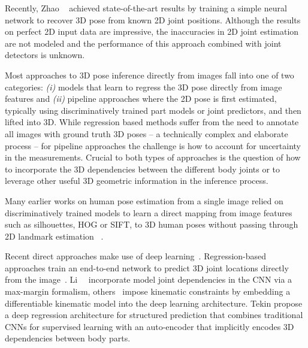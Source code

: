 \documentclass[10pt,twocolumn,letterpaper]{article}
\begin{document}
Recently, Zhao \etal~\cite{zhao2016simple} achieved state-of-the-art
results by training a simple neural network to recover 3D pose from
known 2D joint positions. Although the results on perfect 2D input data
are impressive, the inaccuracies in 2D joint estimation are not
modeled and the performance of this approach combined with joint
detectors is unknown.
 

 Most approaches to 3D pose
inference directly from images fall into one of two categories:
\emph{(i)} models that learn to regress the 3D pose directly from
image features and \emph{(ii)} pipeline approaches where the 2D pose
is first estimated, typically using discriminatively trained part
models or joint predictors, and then lifted into 3D. While regression
based methods suffer from the need to annotate all images with ground
truth 3D poses -- a technically complex and elaborate process -- for
pipeline approaches the challenge is how to account for uncertainty in
the measurements.  Crucial to both types of approaches is the question
of how to incorporate the 3D dependencies between the different body
joints or to leverage other useful 3D geometric information in the
inference process.


Many earlier works on human pose estimation from a single image
relied on discriminatively trained models to learn a direct mapping
from image features such as silhouettes, HOG or SIFT, to 3D human
poses without passing through 2D landmark estimation
~\cite{agarwal2006recovering,Elgammal:Lee:CVPR:2004,conf/mlmi/EkTL07,Mori:Malik:PAMI:2006,Sigal:etal:CVPR:2009}.%

 Recent direct approaches make use of deep
learning~\cite{li20143d, li2015maximum, tompson2014joint,
  toshev2014deeppose}. Regression-based approaches train an end-to-end network 
 to predict 3D joint locations directly from the
image~\cite{toshev2014deeppose, li20143d,
  li2015maximum,zhou2016deep}. Li~\etal~\cite{li2015maximum} incorporate
model joint dependencies in the CNN via a max-margin formalism,
others~\cite{zhou2016deep} impose kinematic constraints by embedding a
differentiable kinematic model into the deep learning architecture.
 Tekin \etal \cite{tekin2016structured} propose a deep
regression architecture for structured prediction that combines
traditional CNNs for supervised learning with an auto-encoder that
implicitly encodes 3D dependencies between body parts.
\end{document}

